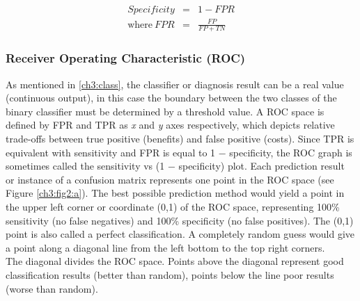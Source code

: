 \begin{eqnarray}
 Specificity & = & 1 - FPR\\
 \textrm{where} \ FPR & = & \frac{FP}{FP + TN}
\end{eqnarray}

\vspace{0.5cm}

\subsubsection{Receiver Operating Characteristic (ROC)}

As mentioned in \ref{ch3:class}, the classifier or diagnosis result can be a real value (continuous output),
in this case the boundary between the two classes of the binary classifier must be determined by a threshold value.
A \Gls{ROC} space is defined by FPR and TPR as \textit{x} and \textit{y} axes respectively, which depicts relative trade-offs between true positive (benefits) and false positive (costs)\cite{ROC01}.
Since TPR is equivalent with sensitivity and FPR is equal to 1 − specificity, the ROC graph is sometimes called the sensitivity vs (1 − specificity) plot\cite{ROC_precision_recall}.
Each prediction result or instance of a confusion matrix represents one point in the ROC space (see Figure \ref{ch3:fig2:a}).
The best possible prediction method would yield a point in the upper left corner or coordinate (0,1) of the ROC space, representing 100\% sensitivity (no false negatives)
and 100\% specificity (no false positives). The (0,1) point is also called a perfect classification. A completely random guess would give a point along a diagonal line
from the left bottom to the top right corners.\\
The diagonal divides the \Gls{ROC} space. Points above the diagonal represent good classification results (better than random),
points below the line poor results (worse than random).

